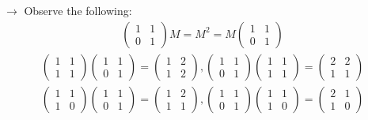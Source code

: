 \documentclass[12pt,a4paper]{article}
\begin{document}
$\rightarrow$ Observe the following:
\begin{align*}
\begin{pmatrix}
1 & 1 \\
0 & 1
\end{pmatrix}
M = M^2 = M\begin{pmatrix}
1 & 1 \\
0 & 1
\end{pmatrix} 
\end{align*}
\begin{align*}
\begin{pmatrix}
1 & 1 \\
1 & 1
\end{pmatrix}
\begin{pmatrix}
1 & 1 \\
0 & 1
\end{pmatrix} = \begin{pmatrix}
1 & 2 \\
1 & 2
\end{pmatrix},
\begin{pmatrix}
1 & 1 \\
0 & 1
\end{pmatrix}
\begin{pmatrix}
1 & 1 \\
1 & 1
\end{pmatrix} = \begin{pmatrix}
2 & 2 \\
1 & 1
\end{pmatrix}
\end{align*}
\begin{align*}
\begin{pmatrix}
1 & 1 \\
1 & 0
\end{pmatrix}
\begin{pmatrix}
1 & 1 \\
0 & 1
\end{pmatrix} = \begin{pmatrix}
1 & 2 \\
1 & 1
\end{pmatrix}
,
\begin{pmatrix}
1 & 1 \\
0 & 1
\end{pmatrix}
\begin{pmatrix}
1 & 1 \\
1 & 0
\end{pmatrix} = \begin{pmatrix}
2 & 1 \\
1 & 0
\end{pmatrix}
\end{align*}
\end{document}
